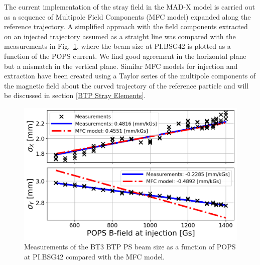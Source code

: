 The current implementation of the stray field in the \mbox{MAD-X}\cite{noauthor_mad_nodate} model is carried out as a sequence of Multipole Field Components (MFC model) expanded along the reference trajectory. A simplified approach with the field components extracted on an injected trajectory assumed as a straight line was compared with the measurements in Fig.~\ref{fig:injection_btp_beam_size}, where the beam size at PI.BSG42 is plotted as a function of the POPS current. We find good agreement in the horizontal plane but a mismatch in the vertical plane. Similar MFC models for injection and extraction have been created using a Taylor series of the multipole components of the magnetic field about the curved trajectory of the reference particle and will be discussed in section \ref{BTP Stray Elements}.

\begin{figure}[!htb]
   \centering
   \includegraphics*[width=0.7\columnwidth]{01_Introduction/images/injection_measurement_beam_size.png}
   \caption{Measurements of the BT3 BTP PS beam size as a function of POPS at PI.BSG42 compared with the MFC model.}
   \label{fig:injection_btp_beam_size}
\end{figure}


